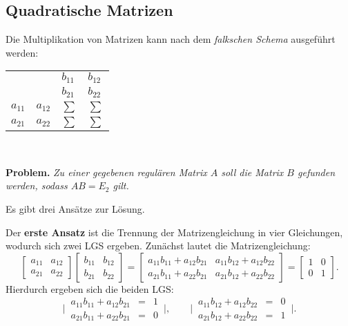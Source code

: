\documentclass[a4paper,11pt,fleqn,twoside]{scrartcl}
\numberwithin{equation}{section}
\newcommand{\strong}[1]{{\sf\bfseries #1}}
\begin{document}
\subsection{Quadratische Matrizen}
Die Multiplikation von Matrizen kann nach dem \emph{falkschen Schema}
ausgeführt werden:\\

\qquad\begin{tabular}{rr|ll}
& & $b_{11}$ & $b_{12}$\\
& & $b_{21}$ & $b_{22}$\\
\hline
$a_{11}$ & $a_{12}$ & $\sum$ & $\sum$\\
$a_{21}$ & $a_{22}$ & $\sum$ & $\sum$
\end{tabular}\\
\phantom{x}

\strong{Problem.} \emph{Zu einer gegebenen regulären
Matrix $A$ soll die Matrix
$B$ gefunden werden, sodass $AB=E_2$ gilt.}

Es gibt drei Ansätze zur Lösung.

Der \strong{erste Ansatz}
ist die Trennung der Matrizengleichung in vier Gleichungen, wodurch
sich zwei LGS ergeben. Zunächst lautet die Matrizengleichung:%
\begin{equation}
\begin{bmatrix}
a_{11} & a_{12}\\
a_{21} & a_{22}
\end{bmatrix}
\begin{bmatrix}
b_{11} & b_{12}\\
b_{21} & b_{22}
\end{bmatrix}
= \begin{bmatrix}
a_{11}b_{11}+a_{12}b_{21} & a_{11}b_{12}+a_{12}b_{22}\\
a_{21}b_{11}+a_{22}b_{21} & a_{21}b_{12}+a_{22}b_{22}
\end{bmatrix}
= \begin{bmatrix}
1 & 0\\
0 & 1
\end{bmatrix}.
\end{equation}
Hierdurch ergeben sich die beiden LGS:
\begin{equation}
\bigg|\,\begin{matrix}
a_{11}b_{11}+a_{12}b_{21} &=& 1\\
a_{21}b_{11}+a_{22}b_{21} &=& 0
\end{matrix}\,\bigg|,\qquad
\bigg|\,\begin{matrix}
a_{11}b_{12}+a_{12}b_{22} &=& 0\\
a_{21}b_{12}+a_{22}b_{22} &=& 1
\end{matrix}\,\bigg|.
\end{equation}
\end{document}
